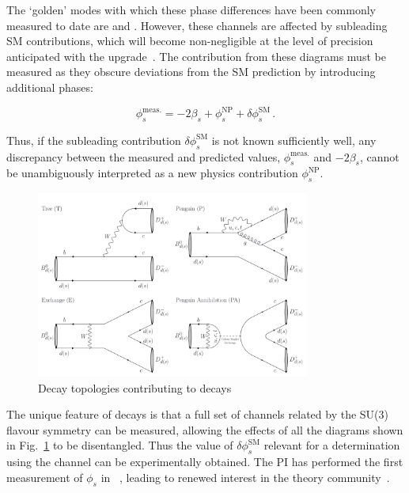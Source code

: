 \documentclass[11pt,a4paper]{article}
\begin{document}
The `golden' modes with which these phase differences have been commonly measured to date are \HepProcess{\PBs\to\PJpsi\Pphi} and \HepProcess{\PBzero\to\PJpsi\PKshort}. 
However, these channels are affected by subleading SM contributions, which will become non-negligible at the level of precision anticipated with the \LHCb upgrade~\cite{Liu:2013nea}.
The contribution from these diagrams must be measured as they obscure deviations from the SM prediction by introducing additional phases:

\begin{equation}
\phi_s^{\text{meas.}} = -2\beta_{s} + \phi_s^{\text{NP}} +  \delta\phi_s^{\text{SM}} \, .
\end{equation}

Thus, if the subleading contribution $\delta\phi_s^{\text{SM}}$ is not known sufficiently well, any discrepancy between the measured and predicted values, $\phi_s^{\text{meas.}}$ and $-2\beta_{s}$, cannot be unambiguously interpreted as a new physics contribution $\phi_s^{\text{NP}}$.

\begin{figure}
    \centering
    \includegraphics[width=0.8\textwidth]{figs/penguins.png}
    \caption{Decay topologies contributing to \HepProcess{\PB\to\PD\PD} decays~\cite{Bel:2015wha}}
    \label{fig:penguins}
\end{figure}

The unique feature of \HepProcess{\PB\to\PD\PD} decays is that a full set of channels related by the SU(3) flavour symmetry can be measured, allowing the effects of all the diagrams shown in Fig.~\ref{fig:penguins} to be disentangled.
Thus the value of $\delta\phi^{\text{SM}}_s$ relevant for a determination using the \HepProcess{\PBs\to\PDsplus\PDsminus} channel can be experimentally obtained.
The PI has performed the first measurement of $\phi_s$ in \HepProcess{\PBs\to\PDsplus\PDsminus}~\cite{Aaij:2014ywt}, leading to renewed interest in the theory community~\cite{Jung:2014jfa,Bel:2015wha,Fleischer:2016dqd}.
\end{document}
